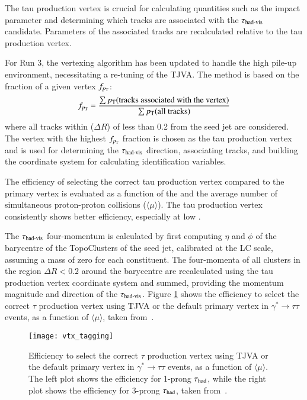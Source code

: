         The tau production vertex is crucial for calculating quantities such as the impact parameter and determining 
        which tracks are associated with the $\tau_{\text{had-vis}}$ candidate. Parameters of the associated 
        tracks are recalculated relative to the tau production vertex.
        
        For Run 3, the vertexing algorithm has been updated to handle the high pile-up environment, necessitating 
        a re-tuning of the TJVA. The method is based on the \pt fraction of a given vertex $f_{p_{\text{T}}}$:
        \[ f_{p_{\text{T}}} = \frac{\sum p_{\text{T}} (\text{tracks associated with the vertex})}{\sum p_{\text{T}} (\text{all tracks})} \]
        where all tracks within (\(\Delta R\)) of less than 0.2 from the seed jet are considered. The vertex 
        with the highest $f_{p_{\text{T}}}$ fraction is chosen as the tau production vertex and is used for determining 
        the $\tau_{\text{had-vis}}$ direction, associating tracks, and building the coordinate system for calculating 
        identification variables.
        
        The efficiency of selecting the correct tau production vertex compared to the primary vertex is evaluated 
        as a function of the \tauhadvis \pt and the average number of simultaneous proton-proton 
        collisions ($\langle \mu \rangle$). The tau production vertex consistently shows better efficiency, 
        especially at low \pt.
        
        The $\tau_{\text{had-vis}}$ four-momentum is calculated by first computing \(\eta\) and \(\phi\) of 
        the barycentre of the TopoClusters of the seed jet, calibrated at the LC scale, assuming a mass of zero 
        for each constituent. The four-momenta of all clusters in the region \(\Delta R < 0.2\) around the 
        barycentre are recalculated using the tau production vertex coordinate system and summed, providing 
        the momentum magnitude and direction of the $\tau_{\text{had-vis}}$. Figure \ref{fig:tau_vtx_eff} shows the 
        efficiency to select the correct $\tau$ production vertex using TJVA or the default primary vertex
        in $\gamma^*\rightarrow\tau\tau$ events, as a function of $\langle \mu \rangle$, taken from~\cite{ATL-PHYS-PUB-2022-044}.
        \begin{figure}[htbp]
            \centering
            \texttt{[image: vtx\_tagging]}
            \caption{
                Efficiency to select the correct $\tau$ production vertex using TJVA or the default primary vertex in $\gamma^*\rightarrow\tau\tau$ events, as a function of $\langle \mu \rangle$. 
                The left plot shows the efficiency for 1-prong $\tau_{\text{had}}$, while the right plot shows the efficiency for 3-prong $\tau_{\text{had}}$, taken from~\cite{ATL-PHYS-PUB-2022-044}.
            }
            \label{fig:tau_vtx_eff}
        \end{figure}
        
